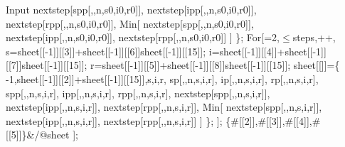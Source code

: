 \documentclass{article}
\begin{document}
\begin{appendix}
\begin{mmaCell}[moredefined={sp, ip, rp, spp, ipp, rpp, eulerImpSIRNVD},morepattern={n_, s_, i_, r_, n, steps_, s0_, i0_, r0_, c_, steps, fp, c, s0, i0, r0, \#},morelocal={i, s, r, sheet, p, nextstep}]{Input}
        nextstep[spp[\mmaPat{\(\pmb{\beta}\)},\mmaPat{\(\pmb{\gamma}\)},n,s0,i0,r0]],
        nextstep[ipp[\mmaPat{\(\pmb{\beta}\)},\mmaPat{\(\pmb{\gamma}\)},n,s0,i0,r0]],
        nextstep[rpp[\mmaPat{\(\pmb{\beta}\)},\mmaPat{\(\pmb{\gamma}\)},n,s0,i0,r0]],
        Min[
            nextstep[spp[\mmaPat{\(\pmb{\beta}\)},\mmaPat{\(\pmb{\gamma}\)},n,s0,i0,r0]],
            nextstep[ipp[\mmaPat{\(\pmb{\beta}\)},\mmaPat{\(\pmb{\gamma}\)},n,s0,i0,r0]],
            nextstep[rpp[\mmaPat{\(\pmb{\beta}\)},\mmaPat{\(\pmb{\gamma}\)},n,s0,i0,r0]]
        ]
    \};
    For[\mmaLoc{\(\pmb{\iota}\)}=2,\mmaLoc{\(\pmb{\iota}\)}\(\pmb{\leq}\)steps,\mmaLoc{\(\pmb{\iota}\)}++,
        s=sheet[[\mmaLoc{\(\pmb{\iota}\)}-1]][[3]]+sheet[[\mmaLoc{\(\pmb{\iota}\)}-1]][[6]]sheet[[\mmaLoc{\(\pmb{\iota}\)}-1]][[15]];
        i=sheet[[\mmaLoc{\(\pmb{\iota}\)}-1]][[4]]+sheet[[\mmaLoc{\(\pmb{\iota}\)}-1]][[7]]sheet[[\mmaLoc{\(\pmb{\iota}\)}-1]][[15]];
        r=sheet[[\mmaLoc{\(\pmb{\iota}\)}-1]][[5]]+sheet[[\mmaLoc{\(\pmb{\iota}\)}-1]][[8]]sheet[[\mmaLoc{\(\pmb{\iota}\)}-1]][[15]];
        sheet[[\mmaLoc{\(\pmb{\iota}\)}]]=\{
            \mmaLoc{\(\pmb{\iota}\)}-1,sheet[[\mmaLoc{\(\pmb{\iota}\)}-1]][[2]]+sheet[[\mmaLoc{\(\pmb{\iota}\)}-1]][[15]],s,i,r,
            sp[\mmaPat{\(\pmb{\beta}\)},\mmaPat{\(\pmb{\gamma}\)},n,s,i,r],
            ip[\mmaPat{\(\pmb{\beta}\)},\mmaPat{\(\pmb{\gamma}\)},n,s,i,r],
            rp[\mmaPat{\(\pmb{\beta}\)},\mmaPat{\(\pmb{\gamma}\)},n,s,i,r],
            spp[\mmaPat{\(\pmb{\beta}\)},\mmaPat{\(\pmb{\gamma}\)},n,s,i,r],
            ipp[\mmaPat{\(\pmb{\beta}\)},\mmaPat{\(\pmb{\gamma}\)},n,s,i,r],
            rpp[\mmaPat{\(\pmb{\beta}\)},\mmaPat{\(\pmb{\gamma}\)},n,s,i,r],
            nextstep[spp[\mmaPat{\(\pmb{\beta}\)},\mmaPat{\(\pmb{\gamma}\)},n,s,i,r]],
            nextstep[ipp[\mmaPat{\(\pmb{\beta}\)},\mmaPat{\(\pmb{\gamma}\)},n,s,i,r]],
            nextstep[rpp[\mmaPat{\(\pmb{\beta}\)},\mmaPat{\(\pmb{\gamma}\)},n,s,i,r]],
            Min[
                nextstep[spp[\mmaPat{\(\pmb{\beta}\)},\mmaPat{\(\pmb{\gamma}\)},n,s,i,r]],
                nextstep[ipp[\mmaPat{\(\pmb{\beta}\)},\mmaPat{\(\pmb{\gamma}\)},n,s,i,r]],
                nextstep[rpp[\mmaPat{\(\pmb{\beta}\)},\mmaPat{\(\pmb{\gamma}\)},n,s,i,r]]
            ]
        \};
    ];
    \{#[[2]],#[[3]],#[[4]],#[[5]]\}&/@sheet
  ];
\end{mmaCell}


\end{appendix}
\end{document}
